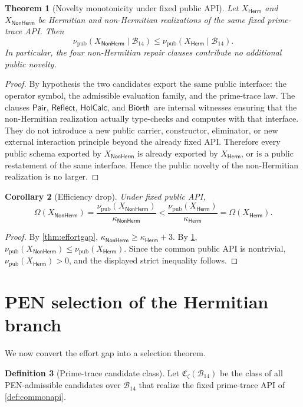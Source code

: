 \documentclass[11pt,a4paper]{article}
\theoremstyle{plain}
\newtheorem{theorem}{Theorem}[section]
\newtheorem{corollary}[theorem]{Corollary}
\theoremstyle{definition}
\newtheorem{definition}[theorem]{Definition}
\theoremstyle{remark}
\newcommand{\Bcal}{\mathcal{B}}
\newcommand{\effort}{\kappa}
\newcommand{\novelty}{\nu}
\newcommand{\efficiency}{\Omega}
\newcommand{\pair}{\ensuremath{\mathsf{Pair}}}
\newcommand{\reflect}{\ensuremath{\mathsf{Reflect}}}
\newcommand{\holcalc}{\ensuremath{\mathsf{HolCalc}}}
\newcommand{\biorth}{\ensuremath{\mathsf{Biorth}}}
\newcommand{\herm}{\ensuremath{\mathsf{Herm}}}
\newcommand{\nonherm}{\ensuremath{\mathsf{NonHerm}}}
\begin{document}
\begin{theorem}[Novelty monotonicity under fixed public API]
\label{thm:noveltymonotone}
Let $X_{\herm}$ and $X_{\nonherm}$ be Hermitian and non-Hermitian realizations of the same fixed prime-trace API. Then
\[
\novelty_{\mathrm{pub}}(X_{\nonherm}\mid\Bcal_{14})\le
\novelty_{\mathrm{pub}}(X_{\herm}\mid\Bcal_{14}).
\]
In particular, the four non-Hermitian repair clauses contribute no additional public novelty.
\end{theorem}

\begin{proof}
By hypothesis the two candidates export the same public interface: the operator symbol, the admissible evaluation family, and the prime-trace law. The clauses \pair, \reflect, \holcalc, and \biorth\ are internal witnesses ensuring that the non-Hermitian realization actually type-checks and computes with that interface. They do not introduce a new public carrier, constructor, eliminator, or new external interaction principle beyond the already fixed API. Therefore every public schema exported by $X_{\nonherm}$ is already exported by $X_{\herm}$, or is a public restatement of the same interface. Hence the public novelty of the non-Hermitian realization is no larger.
\end{proof}

\begin{corollary}[Efficiency drop]
\label{cor:effdrop}
Under fixed public API,
\[
\efficiency(X_{\nonherm}) = \frac{\novelty_{\mathrm{pub}}(X_{\nonherm})}{\effort_{\nonherm}}
<
\frac{\novelty_{\mathrm{pub}}(X_{\herm})}{\effort_{\herm}}
= \efficiency(X_{\herm}).
\]
\end{corollary}

\begin{proof}
By \cref{thm:effortgap}, $\effort_{\nonherm}\ge \effort_{\herm}+3$. By \cref{thm:noveltymonotone}, $\novelty_{\mathrm{pub}}(X_{\nonherm})\le \novelty_{\mathrm{pub}}(X_{\herm})$. Since the common public API is nontrivial, $\novelty_{\mathrm{pub}}(X_{\herm})>0$, and the displayed strict inequality follows.
\end{proof}

\section{PEN selection of the Hermitian branch}

We now convert the effort gap into a selection theorem.

\begin{definition}[Prime-trace candidate class]
Let $\mathfrak C_{\zeta}(\Bcal_{14})$ be the class of all PEN-admissible candidates over $\Bcal_{14}$ that realize the fixed prime-trace API of \cref{def:commonapi}.
\end{definition}
\end{document}
